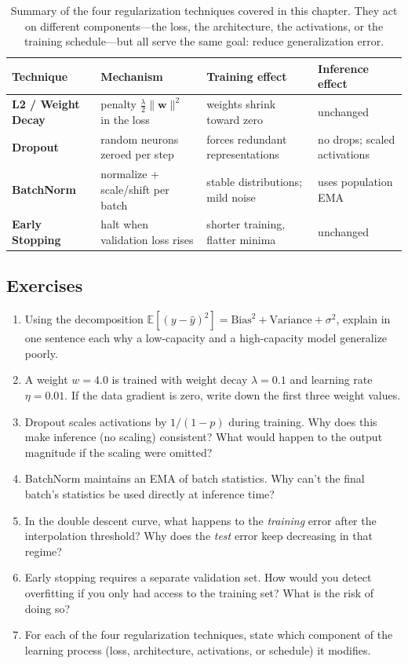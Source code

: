 \documentclass{tufte-handout}
\let\subsubsection\subsection
\begin{document}
\begin{table}[htbp]
\centering
\small
\begin{tabularx}{\textwidth}{@{}>{\raggedright\arraybackslash}p{2.3cm}X X X@{}}
\toprule
\textbf{Technique} & \textbf{Mechanism} & \textbf{Training effect} & \textbf{Inference effect} \\
\midrule
\textbf{L2 / Weight Decay} & penalty $\frac{\lambda}{2}\|\mathbf{w}\|^2$ in the loss & weights shrink toward zero & unchanged \\
\textbf{Dropout} & random neurons zeroed per step & forces redundant representations & no drops; scaled activations \\
\textbf{BatchNorm} & normalize + scale/shift per batch & stable distributions; mild noise & uses population EMA \\
\textbf{Early Stopping} & halt when validation loss rises & shorter training, flatter minima & unchanged \\
\bottomrule
\end{tabularx}
\caption{Summary of the four regularization techniques covered in this chapter. They act on different components---the loss, the architecture, the activations, or the training schedule---but all serve the same goal: reduce generalization error.}
\label{tab:regularization_summary}
\end{table}

\subsubsection{Exercises}

\begin{enumerate}[leftmargin=*, itemsep=4pt]
    \item Using the decomposition $\mathbb{E}[(y-\hat{y})^2] = \text{Bias}^2 + \text{Variance} + \sigma^2$, explain in one sentence each why a low-capacity and a high-capacity model generalize poorly.
    \item A weight $w = 4.0$ is trained with weight decay $\lambda = 0.1$ and learning rate $\eta = 0.01$. If the data gradient is zero, write down the first three weight values.
    \item Dropout scales activations by $1/(1-p)$ during training. Why does this make inference (no scaling) consistent? What would happen to the output magnitude if the scaling were omitted?
    \item BatchNorm maintains an EMA of batch statistics. Why can't the final batch's statistics be used directly at inference time?
    \item In the double descent curve, what happens to the \emph{training} error after the interpolation threshold? Why does the \emph{test} error keep decreasing in that regime?
    \item Early stopping requires a separate validation set. How would you detect overfitting if you only had access to the training set? What is the risk of doing so?
    \item For each of the four regularization techniques, state which component of the learning process (loss, architecture, activations, or schedule) it modifies.
\end{enumerate}
\end{document}
